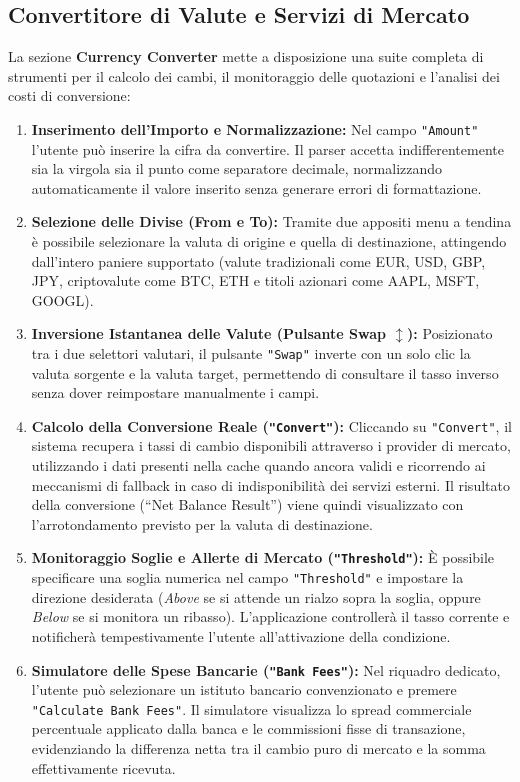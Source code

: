 \documentclass[11pt,a4paper,openright]{report}
\begin{document}
\subsection*{Convertitore di Valute e Servizi di Mercato}
La sezione \textbf{Currency Converter} mette a disposizione una suite completa di strumenti per il calcolo dei cambi, il monitoraggio delle quotazioni e l'analisi dei costi di conversione:
\begin{enumerate}
  \item \textbf{Inserimento dell'Importo e Normalizzazione:} Nel campo \texttt{"Amount"} l'utente può inserire la cifra da convertire. Il parser accetta indifferentemente sia la virgola sia il punto come separatore decimale, normalizzando automaticamente il valore inserito senza generare errori di formattazione.
  \item \textbf{Selezione delle Divise (From e To):} Tramite due appositi menu a tendina è possibile selezionare la valuta di origine e quella di destinazione, attingendo dall'intero paniere supportato (valute tradizionali come EUR, USD, GBP, JPY, criptovalute come BTC, ETH e titoli azionari come AAPL, MSFT, GOOGL).
  \item \textbf{Inversione Istantanea delle Valute (Pulsante Swap $\updownarrow$):} Posizionato tra i due selettori valutari, il pulsante \texttt{"Swap"} inverte con un solo clic la valuta sorgente e la valuta target, permettendo di consultare il tasso inverso senza dover reimpostare manualmente i campi.
  \item \textbf{Calcolo della Conversione Reale (\texttt{"Convert"}):} Cliccando su \texttt{"Convert"}, il sistema recupera i tassi di cambio disponibili attraverso i provider di mercato, utilizzando i dati presenti nella cache quando ancora validi e ricorrendo ai meccanismi di fallback in caso di indisponibilità dei servizi esterni. Il risultato della conversione (``Net Balance Result'') viene quindi visualizzato con l'arrotondamento previsto per la valuta di destinazione.
  \item \textbf{Monitoraggio Soglie e Allerte di Mercato (\texttt{"Threshold"}):} È possibile specificare una soglia numerica nel campo \texttt{"Threshold"} e impostare la direzione desiderata (\emph{Above} se si attende un rialzo sopra la soglia, oppure \emph{Below} se si monitora un ribasso). L'applicazione controllerà il tasso corrente e notificherà tempestivamente l'utente all'attivazione della condizione.
  \item \textbf{Simulatore delle Spese Bancarie (\texttt{"Bank Fees"}):} Nel riquadro dedicato, l'utente può selezionare un istituto bancario convenzionato e premere \texttt{"Calculate Bank Fees"}. Il simulatore visualizza lo spread commerciale percentuale applicato dalla banca e le commissioni fisse di transazione, evidenziando la differenza netta tra il cambio puro di mercato e la somma effettivamente ricevuta.

\end{enumerate}
\end{document}
